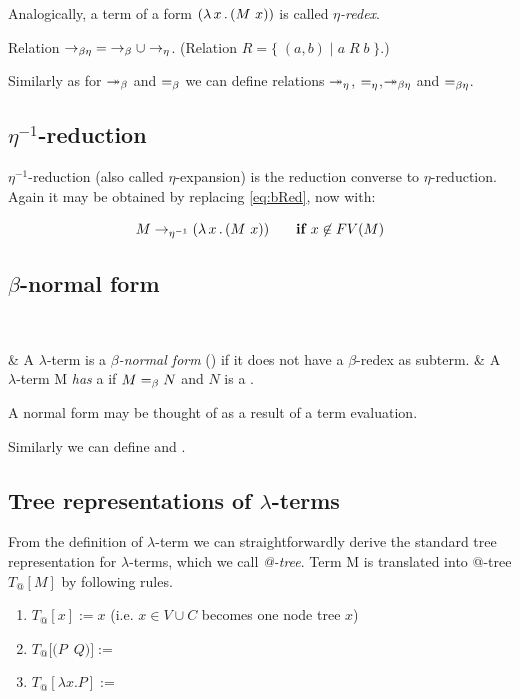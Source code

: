 \documentclass[12pt,a4paper]{report}
\makeatletter
\newcommand{\lterm}{$\lambda$-term\xspace}
\newcommand{\lterms}{$\lambda$-terms\xspace}
\newcommand{\atTree}{@-tree\xspace}
\makeatother
\begin{document}
Analogically, a term of a form $( \lambda \, x \, . \, (M~x) )$ is called 
\textit{$\eta$-redex}.

Relation $\rightarrow_{\beta\eta}\;=\;\rightarrow_\beta \cup \rightarrow_\eta$. 
(Relation $R = \{\;(a,b)\;|\;a\;R\;b\;\}$.)

Similarly as for $\twoheadrightarrow_\beta$ and $=_\beta$ we can define relations 
$\twoheadrightarrow_\eta$, $=_\eta$,$\twoheadrightarrow_{\beta\eta}$ and $=_{\beta\eta}$.


\subsection{$\eta^{-1}$-reduction}

$\eta^{-1}$-reduction (also called $\eta$-expansion) is 
the reduction converse to $\eta$-reduction.
Again it may be obtained by replacing \ref{eq:bRed}, now with:  

$$M \rightarrow_{\eta^{-1}} ( \lambda \, x \, . \, (M~x) ) \textbf{ ~~~~if } x \not\in FV(M) $$




\subsection{$\beta$-normal form}

~\begin{easylist}[enumerate]
& A \lterm is a \textit{$\beta$-normal form} (\bnf) 
if it does not have a $\beta$-redex as subterm.
& A \lterm M \textit{has} a \bnf if $M =_\beta N$
and $N$ is a \bnf.\\
\end{easylist}
A normal form may be thought of as a result of a term evaluation. 

Similarly we can define \enf and \benf.

\subsection{Tree representations of \lterms}
\label{tree-reps}

\newcommand{\sexprTree}{sexpr-tree\xspace}
\newcommand{\SexprTree}{Sexpr-tree\xspace}



From the definition of \lterm we can straightforwardly derive 
the standard tree representation for \lterms, which we call 
\textit{\atTree}. Term M is 
translated into \atTree $T_@[M]$ by following rules.


\begin{enumerate}
	\item $T_@[x] := x$ (i.e. $x \in V \cup C$ becomes one node tree $x$)
	\item \mbox{$T_@[(P$ $Q)] := $  }
	\item \mbox{$T_@[\lambda x . P] := $  }
\end{enumerate}
\end{document}
